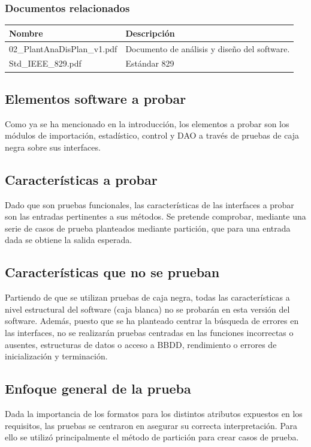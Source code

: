 \documentclass[10pt,a4paper]{article}
\begin{document}
			\subsubsection{Documentos relacionados}
				\begin{table}[htpb]
					\centering
					\begin{tabular}{|l|l|}
					\hline
					\textbf{Nombre} & \textbf{Descripción} \\ \hline
					02\_PlantAnaDisPlan\_v1.pdf & Documento de análisis y diseño del software. \\ \hline
					Std\_IEEE\_829.pdf & Estándar 829 \\ \hline
					\end{tabular}
				\end{table}

	\subsection{Elementos software a probar}
		Como ya se ha mencionado en la introducción, los elementos a probar son los módulos de importación, estadístico, control y DAO a través de pruebas de caja negra sobre sus interfaces.

	\subsection{Características a probar}
		Dado que son pruebas funcionales, las características de las interfaces a probar son las entradas pertinentes a sus métodos. Se pretende comprobar, mediante una serie de casos de prueba planteados mediante partición, que para una entrada dada se obtiene la salida esperada.

	\subsection{Características que no se prueban}
		Partiendo de que se utilizan pruebas de caja negra, todas las características a nivel estructural del software (caja blanca) no se probarán en esta versión del software. Además, puesto que se ha planteado centrar la búsqueda de errores en las interfaces, no se realizarán pruebas centradas en las funciones incorrectas o ausentes, estructuras de datos o acceso a BBDD, rendimiento o errores de inicialización y terminación.

	\subsection{Enfoque general de la prueba}
		Dada la importancia de los formatos para los distintos atributos expuestos en los requisitos, las pruebas se centraron en asegurar su correcta interpretación. Para ello se utilizó principalmente el método de partición para crear casos de prueba.
\end{document}
